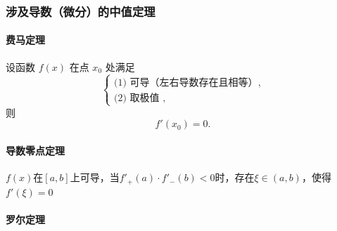 \documentclass[../book.tex]{subfiles}
\begin{document}
    \subsubsection{涉及导数（微分）的中值定理}

    \paragraph{费马定理}

    设函数 $f(x)$ 在点 $x_0$ 处满足
    \[
        \begin{cases}
            \text{(1) 可导（左右导数存在且相等）},\\
            \text{(2) 取极值 },
        \end{cases}
    \]
    则
    \[
        f'(x_0)=0.
    \]

    \paragraph{导数零点定理}

    $f(x)$在$[a, b]$上可导，当$f'_{+}(a) \cdot f'_{-}(b) < 0$时，存在$\xi \in (a, b)$，使得$f'(\xi) = 0$

    \paragraph{罗尔定理}
\end{document}
